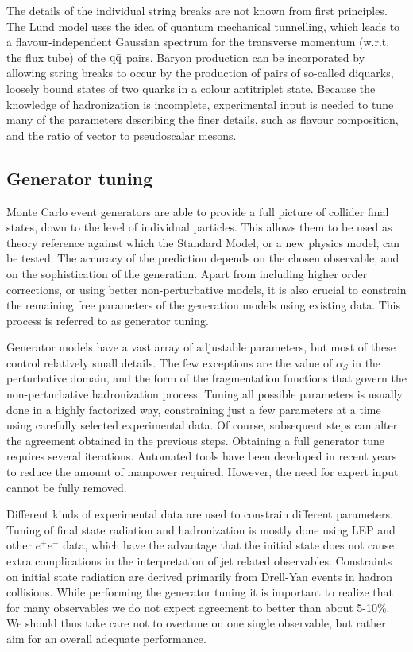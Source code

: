 The details of the individual string breaks are not known from first principles. The Lund model
uses the idea of quantum mechanical tunnelling, which leads to a flavour-independent
Gaussian spectrum for the transverse momentum (w.r.t. the flux tube) of the $\mathrm{q} \bar{\mathrm{q}}$ pairs.
Baryon production can be incorporated by allowing string breaks to occur by the production of
pairs of so-called diquarks, loosely bound states of two quarks in a colour antitriplet state. 
Because the knowledge of hadronization is incomplete, experimental input is needed to tune many of
the parameters describing the finer details, such as flavour composition, and the ratio of vector to
pseudoscalar mesons. 


\subsection{Generator tuning}

Monte Carlo event generators are able to provide a full picture of collider final states, down to
the level of individual particles. This allows them to be used as theory reference against which
the Standard Model, or a new physics model, can be tested. The accuracy of the prediction depends
on the chosen observable, and on the sophistication of the generation. 
Apart from including higher order corrections, or using better non-perturbative models, it is also
crucial to constrain the remaining free parameters of the generation models using existing data.
This process is referred to as generator tuning. 

Generator models have a vast array of adjustable parameters, but most of these control relatively
small details. The few exceptions are the value of $\alpha_S$ in the perturbative domain, and the
form of the fragmentation functions that govern the non-perturbative hadronization process. 
Tuning all possible parameters is usually done in a highly factorized way, constraining just a few
parameters at a time using carefully selected experimental data. 
Of course, subsequent steps can alter the agreement obtained in the previous steps. Obtaining a
full generator tune requires several iterations. 
Automated tools have been developed in recent years to reduce the amount of manpower required.
However, the need for expert input cannot be fully removed. 

Different kinds of experimental data are used to constrain different parameters. Tuning of final
state radiation and hadronization is mostly done using LEP and other $e^+ e^-$ data,  which have
the advantage that the initial state does not cause extra complications in the interpretation of jet
related observables. Constraints on initial state radiation are derived primarily from Drell-Yan
events in hadron collisions. 
While performing the generator tuning it is important to realize that for many observables we do
not expect agreement to better than about 5-10\%. We should thus take care not to overtune on one
single observable, but rather aim for an overall adequate performance. 


